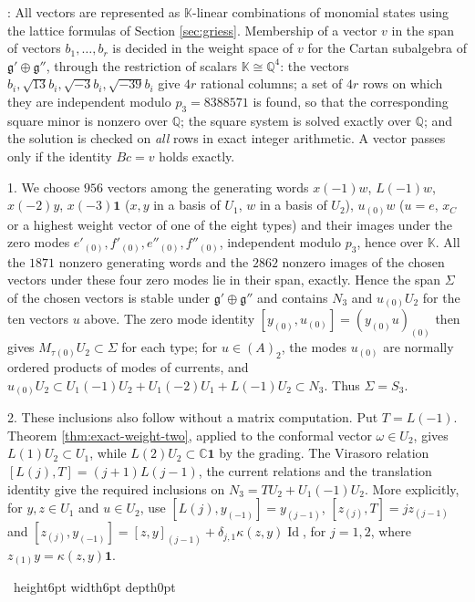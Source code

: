 \documentclass[leqno]{article}
\newcommand{\Cbb}{\ensuremath{\mathbb{C}}}
\newcommand{\K}{\ensuremath{\mathbb{K}}}
\newcommand{\qed}{\hfill \vrule height6pt  width6pt depth0pt}
\newenvironment{proof}[1][]{\noindent {\it Proof #1} : }{\hbox{~}\qed
\smallskip
}
\numberwithin{equation}{section}
\begin{document}
\begin{proof}
All vectors are represented as $\K$-linear combinations of monomial states using the lattice formulas of Section \ref{sec:griess}. Membership of a vector $v$ in the span of vectors $b_1, \dots, b_r$ is decided in the weight space of $v$ for the Cartan subalgebra of $\mathfrak g' \oplus \mathfrak g''$, through the restriction of scalars $\K \cong \mathbb{Q}^4$: the vectors $b_i, \sqrt{13} b_i, \sqrt{-3} b_i, \sqrt{-39} b_i$ give $4r$ rational columns; a set of $4r$ rows on which they are independent modulo $p_3 = 8388571$ is found, so that the corresponding square minor is nonzero over $\mathbb{Q}$; the square system is solved exactly over $\mathbb{Q}$; and the solution is checked on \emph{all} rows in exact integer arithmetic. A vector passes only if the identity $B c = v$ holds exactly.

1. We choose $956$ vectors among the generating words $x(-1)w$, $L(-1)w$, $x(-2)y$, $x(-3)\mathbf 1$ ($x,y$ in a basis of $U_1$, $w$ in a basis of $U_2$), $u_{(0)}w$ ($u = e$, $x_C$ or a highest weight vector of one of the eight types) and their images under the zero modes $e'_{(0)}, f'_{(0)}, e''_{(0)}, f''_{(0)}$, independent modulo $p_3$, hence over $\K$. All the $1871$ nonzero generating words and the $2862$ nonzero images of the chosen vectors under these four zero modes lie in their span, exactly. Hence the span $\Sigma$ of the chosen vectors is stable under $\mathfrak g' \oplus \mathfrak g''$ and contains $N_3$ and $u_{(0)}U_2$ for the ten vectors $u$ above. The zero mode identity $[y_{(0)}, u_{(0)}] = (y_{(0)}u)_{(0)}$ then gives $M_\tau{}_{(0)}U_2 \subset \Sigma$ for each type; for $u \in (A)_2$, the modes $u_{(0)}$ are normally ordered products of modes of currents, and $u_{(0)}U_2 \subset U_1(-1)U_2 + U_1(-2)U_1 + L(-1)U_2 \subset N_3$. Thus $\Sigma = S_3$.

2. These inclusions also follow without a matrix computation. Put $T = L(-1)$. Theorem \ref{thm:exact-weight-two}, applied to the conformal vector $\omega \in U_2$, gives $L(1)U_2 \subset U_1$, while $L(2)U_2 \subset \Cbb\mathbf 1$ by the grading. The Virasoro relation $[L(j),T] = (j+1)L(j-1)$, the current relations and the translation identity give the required inclusions on $N_3 = TU_2+U_1(-1)U_2$. More explicitly, for $y,z \in U_1$ and $u \in U_2$, use $[L(j),y_{(-1)}] = y_{(j-1)}$, $[z_{(j)},T] = jz_{(j-1)}$ and $[z_{(j)},y_{(-1)}] = [z,y]_{(j-1)}+\delta_{j,1}\kappa(z,y)\operatorname{Id}$, for $j = 1,2$, where $z_{(1)}y = \kappa(z,y)\mathbf 1$.


\end{proof}
\end{document}
